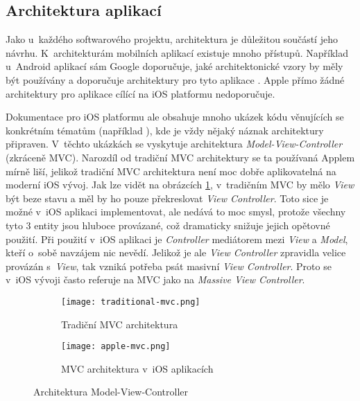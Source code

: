 \subsection{Architektura aplikací}

Jako u~každého softwarového projektu, architektura je důležitou součástí jeho návrhu. K~architekturám mobilních aplikací existuje mnoho přístupů. Například u~Android aplikací sám Google doporučuje, jaké architektonické vzory by měly být používány a doporučuje architektury pro tyto aplikace \cite{android-app-arch}. Apple přímo žádné architektury pro aplikace cílící na iOS platformu nedoporučuje. 

Dokumentace pro iOS platformu ale obsahuje mnoho ukázek kódu věnujících se konkrétním tématům (například \cite{swift-ui-tutorial-complex-interfaces}), kde je vždy nějaký náznak architektury připraven. V~těchto ukázkách se vyskytuje architektura \emph{Model-View-Controller} (zkráceně MVC). Narozdíl od tradiční MVC architektury se ta používaná Applem mírně liší, jelikož tradiční MVC architektura není moc dobře aplikovatelná na moderní iOS vývoj. Jak lze vidět na obrázcích \ref{fig:mvc}, v~tradičním MVC by mělo \emph{View} být beze stavu a měl by ho pouze překreslovat \emph{View Controller}. Toto sice je možné v~iOS aplikaci implementovat, ale nedává to moc smysl, protože všechny tyto 3 entity jsou hluboce provázané, což dramaticky snižuje jejich opětovné použití. Při použití v~iOS aplikaci je \emph{Controller} mediátorem mezi \emph{View} a \emph{Model}, kteří o~sobě navzájem nic nevědí. Jelikož je ale \emph{View Controller} zpravidla velice provázán s~\emph{View}, tak vzniká potřeba psát masivní \emph{View Controller}. Proto se v~iOS vývoji často referuje na MVC jako na \emph{Massive View Controller}.

\begin{figure}[h]
	\centering
	\begin{subfigure}[b]{0.35\textwidth}
		\centering
		\texttt{[image: traditional-mvc.png]}
		\caption{Tradiční MVC architektura}
	\end{subfigure}
	\hspace{1cm}
	\begin{subfigure}[b]{0.45\textwidth}
		\centering
		\texttt{[image: apple-mvc.png]}
		\caption{MVC architektura v~iOS aplikacích}
	\end{subfigure}
	\caption{Architektura Model-View-Controller \cite{ios-architecture-patterns}}
	\label{fig:mvc}
\end{figure}

